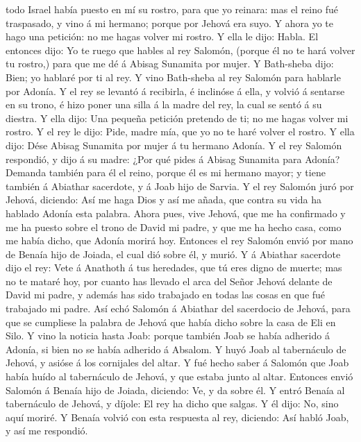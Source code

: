 todo Israel había puesto en mí su rostro, para que yo reinara: mas el
reino fué traspasado, y vino á mi hermano; porque por Jehová era suyo.
 Y ahora yo te hago una petición: no me hagas volver mi
rostro. Y ella le dijo: Habla.  El entonces dijo: Yo te
ruego que hables al rey Salomón, (porque él no te hará volver tu
rostro,) para que me dé á Abisag Sunamita por mujer.  Y
Bath-sheba dijo: Bien; yo hablaré por ti al rey.  Y vino
Bath-sheba al rey Salomón para hablarle por Adonía. Y el rey se levantó
á recibirla, é inclinóse á ella, y volvió á sentarse en su trono, é hizo
poner una silla á la madre del rey, la cual se sentó á su diestra.
 Y ella dijo: Una pequeña petición pretendo de ti; no me
hagas volver mi rostro. Y el rey le dijo: Pide, madre mía, que yo no te
haré volver el rostro.  Y ella dijo: Dése Abisag Sunamita
por mujer á tu hermano Adonía.  Y el rey Salomón respondió,
y dijo á su madre: ¿Por qué pides á Abisag Sunamita para Adonía? Demanda
también para él el reino, porque él es mi hermano mayor; y tiene también
á Abiathar sacerdote, y á Joab hijo de Sarvia.  Y el rey
Salomón juró por Jehová, diciendo: Así me haga Dios y así me añada, que
contra su vida ha hablado Adonía esta palabra.  Ahora pues,
vive Jehová, que me ha confirmado y me ha puesto sobre el trono de David
mi padre, y que me ha hecho casa, como me había dicho, que Adonía morirá
hoy.  Entonces el rey Salomón envió por mano de Benaía hijo
de Joiada, el cual dió sobre él, y murió.  Y á Abiathar
sacerdote dijo el rey: Vete á Anathoth á tus heredades, que tú eres
digno de muerte; mas no te mataré hoy, por cuanto has llevado el arca
del Señor Jehová delante de David mi padre, y además has sido trabajado
en todas las cosas en que fué trabajado mi padre.  Así echó
Salomón á Abiathar del sacerdocio de Jehová, para que se cumpliese la
palabra de Jehová que había dicho sobre la casa de Eli en Silo.
 Y vino la noticia hasta Joab: porque también Joab se había
adherido á Adonía, si bien no se había adherido á Absalom. Y huyó Joab
al tabernáculo de Jehová, y asióse á los cornijales del altar.
 Y fué hecho saber á Salomón que Joab había huído al
tabernáculo de Jehová, y que estaba junto al altar. Entonces envió
Salomón á Benaía hijo de Joiada, diciendo: Ve, y da sobre él.
 Y entró Benaía al tabernáculo de Jehová, y díjole: El rey
ha dicho que salgas. Y él dijo: No, sino aquí moriré. Y Benaía volvió
con esta respuesta al rey, diciendo: Así habló Joab, y así me respondió.
